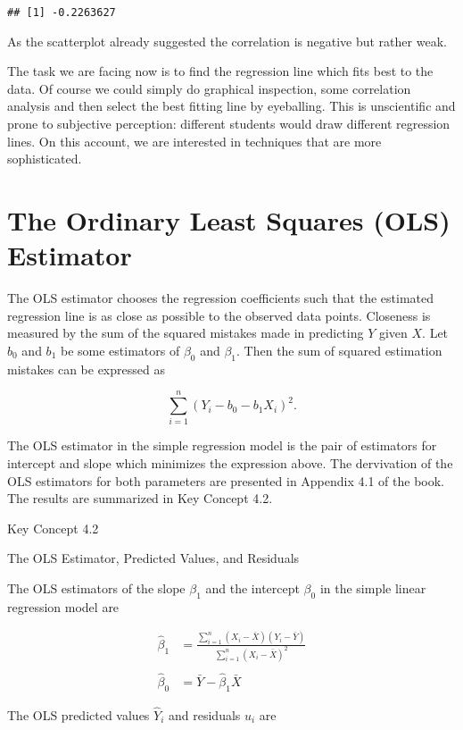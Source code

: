 \documentclass[]{book}
\theoremstyle{definition}
\theoremstyle{definition}
\theoremstyle{definition}
\theoremstyle{remark}
\begin{document}
\begin{verbatim}
## [1] -0.2263627
\end{verbatim}

As the scatterplot already suggested the correlation is negative but
rather weak.

The task we are facing now is to find the regression line which fits
best to the data. Of course we could simply do graphical inspection,
some correlation analysis and then select the best fitting line by
eyeballing. This is unscientific and prone to subjective perception:
different students would draw different regression lines. On this
account, we are interested in techniques that are more sophisticated.

\section{The Ordinary Least Squares (OLS)
Estimator}\label{the-ordinary-least-squares-ols-estimator}

The OLS estimator chooses the regression coefficients such that the
estimated regression line is as close as possible to the observed data
points. Closeness is measured by the sum of the squared mistakes made in
predicting \(Y\) given \(X\). Let \(b_0\) and \(b_1\) be some estimators
of \(\beta_0\) and \(\beta_1\). Then the sum of squared estimation
mistakes can be expressed as

\[ \sum^n_{i = 1} (Y_i - b_0 - b_1 X_i)^2. \]

The OLS estimator in the simple regression model is the pair of
estimators for intercept and slope which minimizes the expression above.
The dervivation of the OLS estimators for both parameters are presented
in Appendix 4.1 of the book. The results are summarized in Key Concept
4.2.

Key Concept 4.2

The OLS Estimator, Predicted Values, and Residuals

The OLS estimators of the slope \(\beta_1\) and the intercept
\(\beta_0\) in the simple linear regression model are

\begin{align}
  \hat{\beta}_1 & = \frac{ \sum_{i = 1}^n (X_i - \bar{X})(Y_i - \bar{Y}) } { \sum_{i=1}^n (X_i -   \bar{X})^2}  \\
  \\
  \hat{\beta}_0 & =  \bar{Y} - \hat{\beta}_1 \bar{X} 
\end{align}

The OLS predicted values \(\hat{Y}_i\) and residuals \(\hat{u}_i\) are
\end{document}
